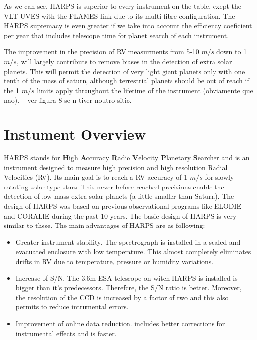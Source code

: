 \documentclass[dvips,12pt,a4paper]{report}
\begin{document}
{{As we can see, HARPS is superior to every instrument on the table, exept the VLT UVES with the FLAMES link due to its multi fibre configuration. The HARPS supremacy is even greater if we take into account the efficiency coeficient per year that includes telescope time for planet search of each instrument. 

The improvement in the precision of RV measurments from 5-10 $m/s$ down to 1 $m/s$, will largely contribute to remove biases in the detection of extra solar planets.  This will permit the detection of very light giant planets only with one tenth of the mass of saturn, although terrestrial planets should be out of reach if the 1 $m/s$ limits apply throughout the lifetime of the instrument (obviamente que nao). -- ver figura 8 se n tiver noutro sitio. 

\section{Instument Overview}

HARPS stands for \textbf{H}igh \textbf{A}ccuracy \textbf{R}adio \textbf{V}elocity \textbf{P}lanetary \textbf{S}earcher and is an instrument designed to measure high precision and high resolution Radial Velocities (RV). Its main goal is to reach a RV accuracy of 1 $m/s$ for slowly rotating solar type stars. This never before reached precisions enable the detection of low mass extra solar planets (a little smaller than Saturn). 
The design of HARPS was based on previous observational programs like ELODIE and CORALIE during the past 10 years. The basic design of HARPS is very similar to these. The main advantages of HARPS are as following:
\begin{itemize}
 \item Greater instrument stability. The spectrograph is installed in a sealed and evacuated enclosure with low temperature. This almost completely eliminates drifts in RV due to temperature, pressure or humidity variations.
\item Increase of S/N. The 3.6m ESA telescope on witch HARPS is installed is bigger than it's predecessors. Therefore, the S/N ratio is better. Moreover, the resolution of the CCD is increased by a factor of two and this also permits to reduce intrumental errors.
\item Improvement of online data reduction. includes better corrections for instrumental effects and is faster.
\end{itemize}

}}
\end{document}
